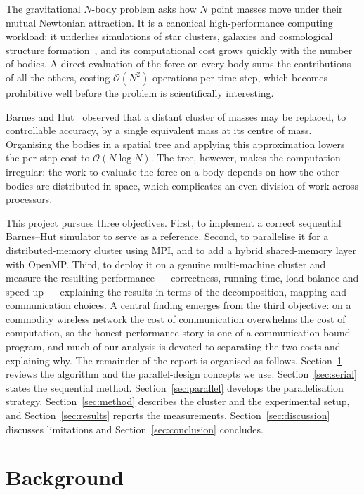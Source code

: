 \documentclass[11pt,a4paper]{article}
\begin{document}
The gravitational $N$-body problem asks how $N$ point masses move under their
mutual Newtonian attraction. It is a canonical high-performance computing
workload: it underlies simulations of star clusters, galaxies and cosmological
structure formation~\cite{aarseth2003}, and its computational cost grows quickly
with the number of bodies. A direct evaluation of the force on every body sums the
contributions of all the others, costing $\mathcal{O}(N^2)$ operations per
time step, which becomes prohibitive well before the problem is scientifically
interesting.

Barnes and Hut~\cite{barnes1986} observed that a distant cluster of masses may be
replaced, to controllable accuracy, by a single equivalent mass at its centre of
mass. Organising the bodies in a spatial tree and applying this approximation
lowers the per-step cost to $\mathcal{O}(N\log N)$. The tree, however, makes the
computation irregular: the work to evaluate the force on a body depends on how the
other bodies are distributed in space, which complicates an even division of work
across processors.

This project pursues three objectives. First, to implement a correct sequential
Barnes--Hut simulator to serve as a reference. Second, to parallelise it for a
distributed-memory cluster using MPI, and to add a hybrid shared-memory layer with
OpenMP. Third, to deploy it on a genuine multi-machine cluster and measure the
resulting performance --- correctness, running time, load balance and speed-up ---
explaining the results in terms of the decomposition, mapping and communication
choices. A central finding emerges from the third objective: on a commodity
wireless network the cost of communication overwhelms the cost of computation, so
the honest performance story is one of a communication-bound program, and much of
our analysis is devoted to separating the two costs and explaining why. The
remainder of the report is organised as follows. Section~\ref{sec:background}
reviews the algorithm and the parallel-design concepts we use.
Section~\ref{sec:serial} states the sequential method.
Section~\ref{sec:parallel} develops the parallelisation strategy.
Section~\ref{sec:method} describes the cluster and the experimental setup, and
Section~\ref{sec:results} reports the measurements. Section~\ref{sec:discussion}
discusses limitations and Section~\ref{sec:conclusion} concludes.

\section{Background}
\label{sec:background}
\end{document}
